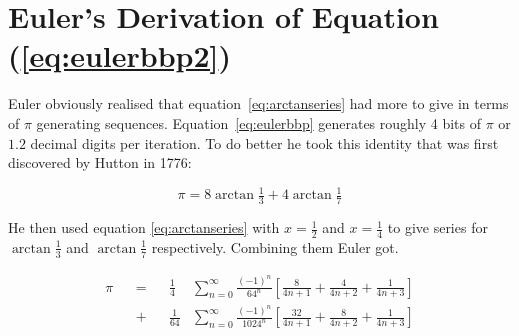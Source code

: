 \documentclass[11pt]{article}
\begin{document}
\section{Euler's Derivation of Equation (\ref{eq:eulerbbp2})}

Euler obviously realised that equation~\eqref{eq:arctanseries} had more to give in terms of $\pi$ generating sequences. Equation~\eqref{eq:eulerbbp} generates roughly 4 bits of $\pi$ or $1.2$ decimal digits per iteration. To do better he took this identity that was first discovered by Hutton \cite{Arndt2001} in 1776:

\begin{equation}
\pi = 8 \arctan{\tfrac{1}{3}} + 4 \arctan{\tfrac{1}{7}}
\end{equation}

He then used equation \eqref{eq:arctanseries} with $x=\frac{1}{2}$ and $x=\frac{1}{4}$ to give series for $\arctan{\frac{1}{3}}$ and $\arctan{\frac{1}{7}}$ respectively. Combining them Euler got.

\iffalse                        %

\begin{equation}
\begin{split}
  \pi
  &= 8 \sum_{n = 0}^\infty \frac{(-1)^n}{4^{n+1}} \left[
    \frac{2(\frac{1}{2})^{4n+1}}{4n+1}
    + \frac{2(\frac{1}{2})^{4n+2}}{4n+2}
    + \frac{(\frac{1}{2})^{4n+3}}{4n+3}
  \right] \\
  &+ 4 \sum_{n = 0}^\infty \frac{(-1)^n}{4^{n+1}} \left[
    \frac{2(\frac{1}{4})^{4n+1}}{4n+1}
    + \frac{2(\frac{1}{4})^{4n+2}}{4n+2}
    + \frac{(\frac{1}{4})^{4n+3}}{4n+3}
  \right]
\end{split}
\end{equation}

Which with a bit of simplification becomes

\fi                             %

\begin{equation}
\begin{aligned}
  \pi
  &&=&& \frac{1}{4} &\sum_{n = 0}^\infty \frac{(-1)^n}{64^n} \left[
    \frac{8}{4n+1}
    + \frac{4}{4n+2}
    + \frac{1}{4n+3}
  \right] \\
  &&+&& \frac{1}{64} &\sum_{n = 0}^\infty \frac{(-1)^n}{1024^n} \left[
    \frac{32}{4n+1}
    + \frac{8}{4n+2}
    + \frac{1}{4n+3}
  \right]
\end{aligned}
\end{equation}
\end{document}
